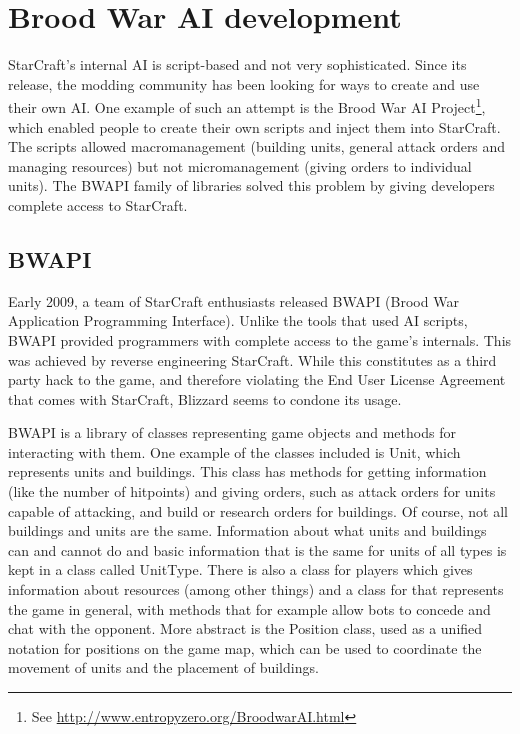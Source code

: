 
\chapter{Brood War AI development}

StarCraft's internal AI is script-based and not very sophisticated. Since its release, the modding community has been looking for ways to create and use their own AI. One example of such an attempt is the Brood War AI Project\footnote{See \url{http://www.entropyzero.org/BroodwarAI.html}}, which enabled people to create their own scripts and inject them into StarCraft. The scripts allowed macromanagement (building units, general attack orders and managing resources) but not micromanagement (giving orders to individual units). The BWAPI family of libraries solved this problem by giving developers complete access to StarCraft.

\section{BWAPI}

Early 2009, a team of StarCraft enthusiasts released BWAPI (Brood War Application Programming Interface). Unlike the tools that used AI scripts, BWAPI provided programmers with complete access to the game's internals. This was achieved by reverse engineering StarCraft. While this constitutes as a third party hack to the game, and therefore violating the End User License Agreement that comes with StarCraft, Blizzard seems to condone its usage.

BWAPI is a library of classes representing game objects and methods for interacting with them. One example of the classes included is Unit, which represents units and buildings. This class has methods for getting information (like the number of hitpoints) and giving orders, such as attack orders for units capable of attacking, and build or research orders for buildings. Of course, not all buildings and units are the same. Information about what units and buildings can and cannot do and basic information that is the same for units of all types is kept in a class called UnitType. There is also a class for players which gives information about resources (among other things) and a class for that represents the game in general, with methods that for example allow bots to concede and chat with the opponent. More abstract is the Position class, used as a unified notation for positions on the game map, which can be used to coordinate the movement of units and the placement of buildings.

